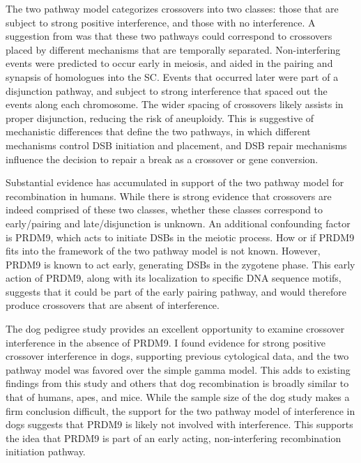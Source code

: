 The two pathway model categorizes crossovers into two classes: those that are subject to strong positive interference, and those with no interference.
A suggestion from \citet{Housworth2003} was that these two pathways could correspond to crossovers placed by different mechanisms that are temporally separated.
Non-interfering events were predicted to occur early in meiosis, and aided in the pairing and synapsis of homologues into the SC.
Events that occurred later were part of a disjunction pathway, and subject to strong interference that spaced out the events along each chromosome.
The wider spacing of crossovers likely assists in proper disjunction, reducing the risk of aneuploidy.
This is suggestive of mechanistic differences that define the two pathways, in which different mechanisms
control DSB initiation and placement, and DSB repair mechanisms influence the decision to repair a break as a crossover or gene conversion\cite{Baudat2007,Berchowitz2010,Stahl2010}.

Substantial evidence has accumulated in support of the two pathway model for recombination in humans\cite{Housworth2003,Fledel-Alon2009,Campbell2015}.
While there is strong evidence that crossovers are indeed comprised of these two classes, whether these classes correspond to early/pairing and late/disjunction is unknown.
An additional confounding factor is PRDM9, which acts to initiate DSBs in the meiotic process.
How or if PRDM9 fits into the framework of the two pathway model is not known.
However, PRDM9 is known to act early, generating DSBs in the zygotene phase\cite{Hayashi2005}.
This early action of PRDM9, along with its localization to specific DNA sequence motifs, suggests that it could be part of the early pairing pathway, and would therefore produce crossovers that are absent of interference.

The dog pedigree study provides an excellent opportunity to examine crossover interference in the absence of PRDM9.
I found evidence for strong positive crossover interference in dogs, supporting previous cytological data\cite{Basheva2008}, and the two pathway model was favored over the simple gamma model.
This adds to existing findings from this study and others\cite{Axelsson2012,Auton2013,Wong2010} that dog recombination is broadly similar to that of humans, apes, and mice.
While the sample size of the dog study makes a firm conclusion difficult, 
the support for the two pathway model of interference in dogs suggests that PRDM9 is likely not involved with interference.
This supports the idea that PRDM9 is part of an early acting, non-interfering recombination initiation pathway.




